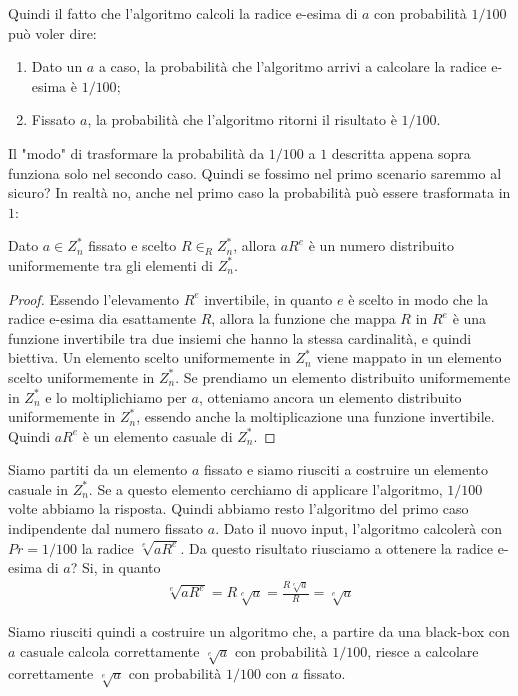 Quindi il fatto che l'algoritmo calcoli la radice e-esima di $a$ con probabilità $1/100$ può voler dire:
\begin{enumerate}
    \item Dato un $a$ a caso, la probabilità che l'algoritmo arrivi a calcolare la radice e-esima è $1/100$;
    \item Fissato $a$, la probabilità che l'algoritmo ritorni il risultato è $1/100$.
\end{enumerate}

\noindent Il "modo" di trasformare la probabilità da $1/100$ a $1$ descritta appena sopra funziona solo nel secondo caso. Quindi se fossimo nel primo scenario saremmo al sicuro? In realtà no, anche nel primo caso la probabilità può essere trasformata in $1$:

\begin{definition}
Dato $a \in Z_n^*$ fissato e scelto $R \in_R Z_n^*$, allora $aR^e$ è un numero distribuito uniformemente tra gli elementi di $Z_n^*$. 
\end{definition}
\begin{proof}
Essendo l'elevamento $R^e$ invertibile, in quanto $e$ è scelto in modo che la radice e-esima dia esattamente $R$, allora la funzione che mappa $R$ in $R^e$ è una funzione invertibile tra due insiemi che hanno la stessa cardinalità, e quindi biettiva. Un elemento scelto uniformemente in $Z_n^*$ viene mappato in un elemento scelto uniformemente in $Z_n^*$. Se prendiamo un elemento distribuito uniformemente in $Z_n^*$ e lo moltiplichiamo per $a$, otteniamo ancora un elemento distribuito uniformemente in $Z_n^*$, essendo anche la moltiplicazione una funzione invertibile. Quindi $aR^e$ è un elemento casuale di $Z_n^*$. 
\end{proof}

\noindent Siamo partiti da un elemento $a$ fissato e siamo riusciti a costruire un elemento casuale in $Z_n^*$. Se a questo elemento cerchiamo di applicare l'algoritmo, $1/100$ volte abbiamo la risposta. Quindi abbiamo resto l'algoritmo del primo caso indipendente dal numero fissato $a$. Dato il nuovo input, l'algoritmo calcolerà con $Pr = 1/100$ la radice $\sqrt[e]{aR^e}$. Da questo risultato riusciamo a ottenere la radice e-esima di $a$? Si, in quanto
\begin{align*}
    \sqrt[e]{aR^e} = R\sqrt[e]{a} = \frac{R\sqrt[e]{a}}{R} = \sqrt[e]{a}
\end{align*}

\noindent Siamo riusciti quindi a costruire un algoritmo che, a partire da una black-box con $a$ casuale calcola correttamente $ \sqrt[e]{a}$ con probabilità $1/100$, riesce a calcolare correttamente  $\sqrt[e]{a}$ con probabilità $1/100$ con $a$ fissato. 

